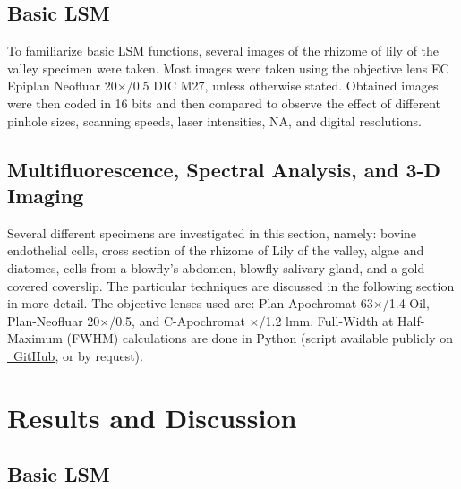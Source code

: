 \subsection{Basic LSM}
To familiarize basic LSM functions, several images of the rhizome of lily of the valley specimen were taken.  
Most images were taken using the objective lens EC Epiplan Neofluar 20$\times$/0.5 DIC M27, unless otherwise stated. Obtained images were then coded in 16 bits and then compared to observe the effect of different pinhole sizes, scanning speeds, laser intensities, NA, and digital resolutions.

\subsection{Multifluorescence, Spectral Analysis, and 3-D Imaging}
Several different specimens are investigated in this section, namely: bovine endothelial cells, cross section of the rhizome of Lily of the valley, algae and diatomes, cells from a blowfly's abdomen, blowfly salivary gland, and a gold covered coverslip. 
The particular techniques are discussed in the following section in more detail. 
The objective lenses used are: Plan-Apochromat 63$\times$/1.4 Oil, Plan-Neofluar 20$\times$/0.5, and C-Apochromat $\times$/1.2 lmm. 
Full-Width at Half-Maximum (FWHM) calculations are done in \faPython Python (script available publicly on \href{https://github.com/howset/LightMicro}{\faGithub~GitHub}, or by request).

\section{Results and Discussion}

\subsection{Basic LSM}

